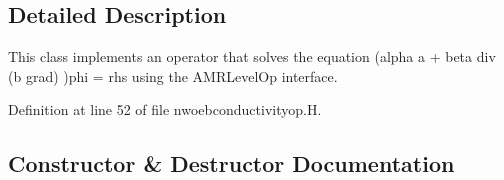 \subsection{Detailed Description}
This class implements an operator that solves the equation (alpha a + beta div (b grad) )phi = rhs using the A\+M\+R\+Level\+Op interface. 

Definition at line 52 of file nwoebconductivityop.\+H.



\subsection{Constructor \& Destructor Documentation}
